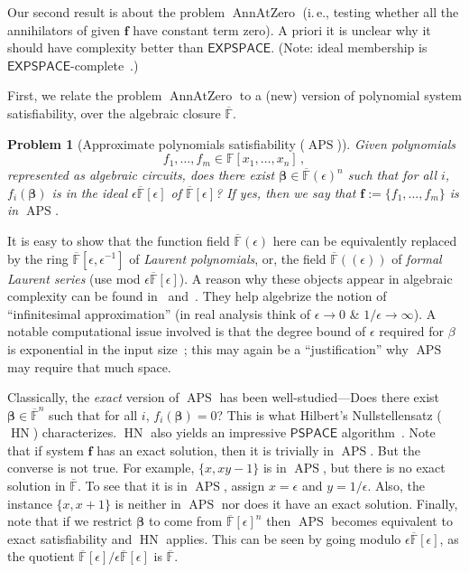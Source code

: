 \documentclass[11pt]{article}
\numberwithin{equation}{section}
\theoremstyle{definition}
\theoremstyle{plain}
\newcommand{\cclass}[1]{\textsf{#1}}
\newcommand{\ie}{i.\,e.}
\newcommand{\F}{\mathbb{F}}
\newcommand{\ol}[1]{\overline{#1}}
\newcommand{\PSPACE}{\cclass{PSPACE}\xspace}  %
\newcommand{\EXPSPACE}{\cclass{EXPSPACE}\xspace} %
\DeclareMathOperator{\APS}{\mathrm{APS}\xspace} %
\DeclareMathOperator{\AnnAtZero}{\mathrm{AnnAtZero}\xspace} %
\DeclareMathOperator{\HN}{\mathrm{HN}\xspace} %
\newtheorem{problem}[theorem]{Problem}
\begin{document}
\smallskip
Our second result is about the problem $\AnnAtZero$ (\ie, testing whether all the annihilators of given $\mathbf{f}$ have constant term zero). A priori it is unclear why it should  have complexity better than
%
$\EXPSPACE$.  %
%
(Note: ideal    %
membership is
%
$\EXPSPACE$-complete~\cite{mayr1982complexity}.)   %
%
%
%
%
%
%


First,   %
we relate %
the problem $\AnnAtZero$  %
to a (new) version of polynomial system satisfiability,
over the algebraic closure $\overline{\F}$. %
%


%
%
\begin{problem}[Approximate polynomials satisfiability ($\APS$)]
Given polynomials
%
%
\[
  f_1,\ldots,f_m \in \F[x_1,\ldots,x_n]\,,
\]
represented as algebraic circuits, %
does there exist $ \mathbf\beta \in \overline{\F}(\epsilon)^n $ such
that for all $i$, $f_i(\mathbf{\beta})$ is in the ideal
$\epsilon \overline{\F}[\epsilon]$ of $\overline{\F}[\epsilon]$? If
yes, then we say that $\mathbf{f}:= \{f_1,\ldots,f_m\}$ is in $\APS$.
\end{problem}

%
It is easy to show that the function %
field $\ol{\F}(\epsilon)$ here can be equivalently replaced by the ring $\overline{\F}[\epsilon, \epsilon^{-1}]$  of \emph{Laurent polynomials}, or, the field $\ol{\F}((\epsilon))$ of \emph{formal Laurent series} (use mod $\epsilon \overline{\F}[\epsilon]$). A reason why these objects appear in algebraic complexity can be found in~\cite[Section~5.2]{burgisser2004complexity} and~\cite[Section~5]{LL89}. They help algebrize the notion of ``infinitesimal approximation'' (in real analysis think of $\epsilon\rightarrow0$ \& $1/\epsilon\rightarrow\infty$). A notable computational issue involved is that the degree bound of $\epsilon$ required for $\beta$ is exponential in the input size~\cite[Proposition~3]{LL89}; this may again be a ``justification''
%
why $\APS$ may require  %
that much space.

\smallskip
Classically, the \emph{exact} version of $\APS$ has been
%
well-studied---Does there exist $\mathbf{\beta} \in \overline{\F}^n$ such that for all $i$, $f_i(\mathbf{\beta})=0 $? This is what Hilbert's Nullstellensatz 
%
($\HN$) %
%
characterizes. 
%
$\HN$ also yields %
an impressive $\PSPACE$ algorithm~\cite{koiran1996hilbert, kollar1988sharp}. Note that if system $\mathbf{f}$ has an exact solution, then it is trivially in $\APS$. But the converse is not true. For example,  $\{x, xy-1\}$ is in $\APS$, but there is no exact solution in $\overline{\F}$. To see that it is in $\APS$, assign $x=\epsilon$ and $y= 1/\epsilon$. Also, the instance $\{x, x+1\}$ is neither in $\APS$ nor
%
does it have  %
an exact solution. Finally, note that if we restrict $ \mathbf{\beta}$ to come from $\overline{\F}[\epsilon]^n$ then $\APS$ becomes equivalent to exact satisfiability and
%
$\HN$ %
applies. This can be seen by going modulo $\epsilon \overline{\F}[\epsilon]$, as the quotient $\overline{\F}[\epsilon]/\epsilon \overline{\F}[\epsilon]$ is $\overline{\F}$.
\end{document}
